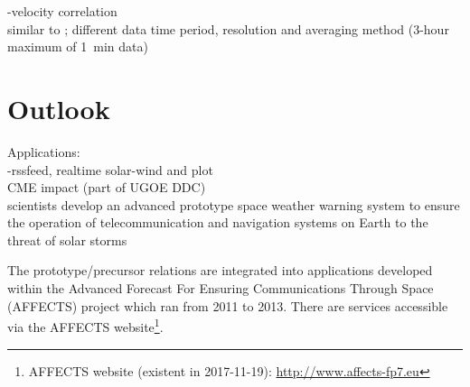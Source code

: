 \Kp-velocity correlation\\
similar to \citet{Elliott2013}; different data time period, resolution and averaging method (3-hour maximum of 1~min data)\\


\section{Outlook}
Applications:\\
\Kp-rssfeed, realtime solar-wind and \Kp{} plot\\
CME \Kp{} impact (part of UGOE DDC)\\

scientists develop an advanced prototype space weather warning system to ensure the operation of telecommunication and navigation systems on Earth to the threat of solar storms

The prototype/precursor relations are integrated into applications developed within the Advanced Forecast For Ensuring Communications Through Space (AFFECTS) project which ran from 2011 to 2013. There are services accessible via the AFFECTS website\footnote{AFFECTS website (existent in 2017-11-19): \url{http://www.affects-fp7.eu}}.\\

